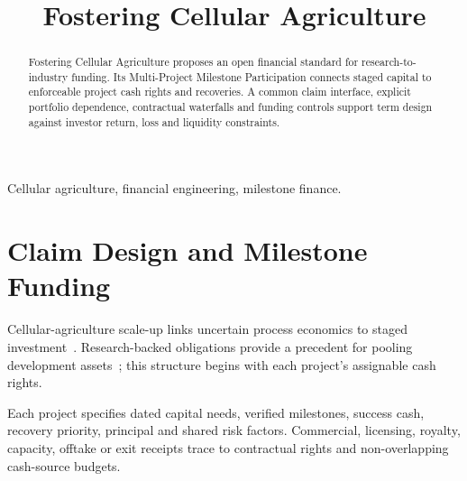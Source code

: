 

\title{Fostering Cellular Agriculture}
\author{
}
\date{}


\maketitle

\begin{abstract}
Fostering Cellular Agriculture proposes an open financial standard for
research-to-industry funding. Its Multi-Project Milestone Participation connects
staged capital to enforceable project cash rights and recoveries. A common
claim interface, explicit portfolio dependence, contractual waterfalls and
funding controls support term design against investor return, loss and
liquidity constraints.
\end{abstract}

\begin{IEEEkeywords}
Cellular agriculture, financial engineering, milestone finance.
\end{IEEEkeywords}

\balance
\section{Claim Design and Milestone Funding}
Cellular-agriculture scale-up links uncertain process economics to staged
investment~\cite{humbird2021scale}. Research-backed obligations provide a
precedent for pooling development assets~\cite{fernandez2012rbo}; this
structure begins with each project's assignable cash rights.

Each project specifies dated capital needs, verified milestones, success cash,
recovery priority, principal and shared risk factors. Commercial, licensing,
royalty, capacity, offtake or exit receipts trace to contractual rights and
non-overlapping cash-source budgets.

